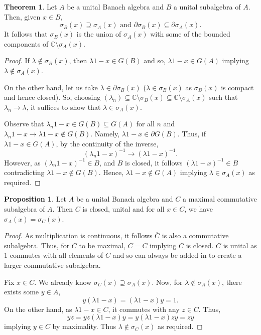 \documentclass[]{article}
\theoremstyle{definition}
\newtheorem{theorem}{Theorem}
\newtheorem{proposition}{Proposition}[section]
\begin{document}
\begin{theorem}\label{thm:spectrum_subalg}
  Let \(A\) be a unital Banach algebra and \(B\) a unital subalgebra of \(A\). Then, given \(x \in B\), 
  \[\sigma_B(x) \supseteq \sigma_A(x) \text{ and } \partial \sigma_B(x) \subseteq \partial \sigma_A(x).\]
  It follows that \(\sigma_B(x)\) is the union of \(\sigma_A(x)\) with some of the bounded components 
  of \(\mathbb{C} \setminus \sigma_A(x)\).
\end{theorem}
\begin{proof}
  If \(\lambda \not\in \sigma_B(x)\), then \(\lambda 1 - x \in G(B)\) and so, \(\lambda 1 - x \in G(A)\) 
  implying \(\lambda \not\in \sigma_A(x)\). 

  On the other hand, let us take \(\lambda \in \partial \sigma_B(x)\) (\(\lambda \in \sigma_B(x)\) as 
  \(\sigma_B(x)\) is compact and hence closed). So, choosing 
  \((\lambda_n) \subseteq \mathbb{C} \setminus \sigma_B(x) \subseteq \mathbb{C} \setminus \sigma_A(x)\) such that \(\lambda_n \to \lambda\), 
  it suffices to show that \(\lambda \in \sigma_A(x)\).

  Observe that \(\lambda_n 1 - x \in G(B) \subseteq G(A)\) for all \(n\) and 
  \(\lambda_n 1 - x \to \lambda 1 - x \not\in G(B)\). Namely, \(\lambda 1 - x \in \partial G(B)\). 
  Thus, if \(\lambda 1 - x \in G(A)\), by the continuity of the inverse, 
  \[(\lambda_n 1 - x)^{-1} \to (\lambda 1 - x)^{-1}.\]
  However, as \((\lambda_n 1 - x)^{-1} \in B\), and \(B\) is closed, it follows \((\lambda 1 - x)^{-1} \in B\) 
  contradicting \(\lambda 1 - x \not\in G(B)\). Hence, \(\lambda 1 - x \not\in G(A)\) implying 
  \(\lambda \in \sigma_A(x)\) as required. 
\end{proof}

\begin{proposition}
  Let \(A\) be a unital Banach algebra and \(C\) a maximal commutative subalgebra of \(A\). Then \(C\)
  is closed, unital and for all \(x \in C\), we have \(\sigma_A(x) = \sigma_C(x)\).  
\end{proposition}
\begin{proof}
  As multiplication is continuous, it follows \(\overline{C}\) is also a commutative subalgebra. Thus, 
  for \(C\) to be maximal, \(C = \overline{C}\) implying \(C\) is closed. \(C\) is unital as 1 commutes 
  with all elements of \(C\) and so can always be added in to create a larger commutative subalgebra.

  Fix \(x \in C\). We already know \(\sigma_C(x) \supseteq \sigma_A(x)\). Now, for \(\lambda \not\in \sigma_A(x)\), 
  there exists some \(y \in A\), 
  \[y(\lambda 1 - x) = (\lambda 1 - x)y = 1.\]
  On the other hand, as \(\lambda 1 - x \in C\), it commutes with any \(z \in C\). Thus, 
  \[yz = yz(\lambda 1 - x)y = y(\lambda 1 - x)zy = zy\]
  implying \(y \in C\) by maximality. Thus \(\lambda \not\in \sigma_C(x)\) as required.
\end{proof}
\end{document}
